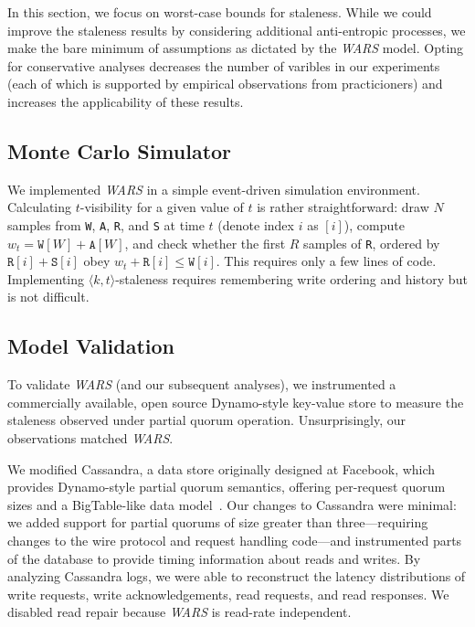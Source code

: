\documentclass{vldb}
\begin{document}
In this section, we focus on worst-case bounds for staleness.  While
we could improve the staleness results by considering additional
anti-entropic processes, we make the bare minimum of assumptions as
dictated by the \textit{WARS}  model.  Opting for conservative analyses
decreases the number of varibles in our experiments (each of which is
supported by empirical observations from practicioners) and increases
the applicability of these results.

\subsection{Monte Carlo Simulator}

We implemented \textit{WARS}  in a simple event-driven simulation environment.
Calculating $t$-visibility for a given value of $t$ is rather
straightforward: draw $N$ samples from \texttt{W}, \texttt{A},
\texttt{R}, and \texttt{S} at time $t$ (denote index $i$ as $[i]$), compute $w_t = \texttt{W}[W]+\texttt{A}[W]$, and check whether the
first $R$ samples of \texttt{R}, ordered by
$\texttt{R}[i]+\texttt{S}[i]$ obey $w_t+\texttt{R}[i] \leq
\texttt{W}[i]$.  This requires only a few lines of code.  Implementing
$\langle k, t \rangle$-staleness requires remembering write ordering
and history but is not difficult.

\subsection{Model Validation}

To validate \textit{WARS}  (and our subsequent analyses), we instrumented a
commercially available, open source Dynamo-style key-value store to
measure the staleness observed under partial quorum operation.
Unsurprisingly, our observations matched \textit{WARS}.

We modified Cassandra, a data store originally designed at Facebook,
which provides Dynamo-style partial quorum semantics, offering
per-request quorum sizes and a BigTable-like data
model~\cite{cassandra, cassandra-sigmod}.  Our changes to Cassandra were minimal:
we added support for partial quorums of size greater than
three---requiring changes to the wire protocol and request handling
code---and instrumented parts of the database to provide timing
information about reads and writes.  By analyzing Cassandra logs, we
were able to reconstruct the latency distributions of write requests,
write acknowledgements, read requests, and read responses.  We
disabled read repair because \textit{WARS} is read-rate independent.
\end{document}
